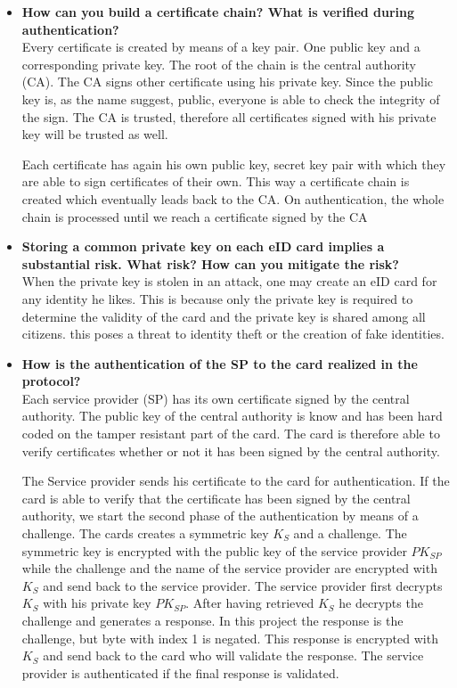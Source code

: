 \documentclass[12pt]{report}
\begin{document}
\begin{itemize}
\item \textbf{How can you build a certificate chain? What is verified during authentication?}\\
Every certificate is created by means of a key pair. One public key and a corresponding private key. The root of the chain is the central authority (CA). The CA signs other certificate using his private key. Since the public key is, as the name suggest, public, everyone is able to check the integrity of the sign. The CA is trusted, therefore all certificates signed with his private key will be trusted as well.

Each certificate has again his own public key, secret key pair with which they are able to sign certificates of their own. This way a certificate chain is created which eventually leads back to the CA. On authentication, the whole chain is processed until we reach a certificate signed by the CA

\item \textbf{Storing a common private key on each eID card implies a substantial risk. What risk? How can you mitigate the risk?}\\
When the private key is stolen in an attack, one may create an eID card for any identity he likes. This is because only the private key is required to determine the validity of the card and the private key is shared among all citizens. this poses a threat to identity theft or the creation of fake identities.

\item \textbf{How is the authentication of the SP to the card realized in the protocol?}\\
Each service provider (SP) has its own certificate signed by the central authority. The public key of the central authority is know and has been hard coded on the tamper resistant part of the card. The card is therefore able to verify certificates whether or not it has been signed by the central authority. 

The Service provider sends his certificate to the card for authentication. If the card is able to verify that the certificate has been signed by the central authority, we start the second phase of the authentication by means of a challenge. The cards creates a symmetric key $K_S$ and a challenge. The symmetric key is encrypted with the public key of the service provider $PK_{SP}$ while the challenge and the name of the service provider are encrypted with $K_S$  and send back to the service provider. The service provider first decrypts $K_S$ with his private key $PK_{SP}$. After having retrieved $K_S$ he decrypts the challenge and generates a response. In this project the response is the challenge, but byte with index 1 is negated. This response is encrypted with $K_S$ and send back to the card who will validate the response. The service provider is authenticated if the final response is validated.


\end{itemize}
\end{document}
